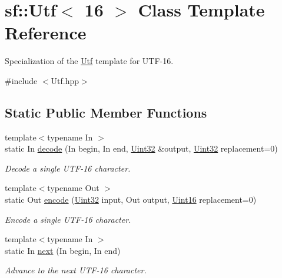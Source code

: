 \hypertarget{classsf_1_1_utf_3_0116_01_4}{\section{sf\-:\-:Utf$<$ 16 $>$ Class Template Reference}
\label{classsf_1_1_utf_3_0116_01_4}
}


Specialization of the \hyperlink{classsf_1_1_utf}{Utf} template for U\-T\-F-\/16.  




{\ttfamily \#include $<$Utf.\-hpp$>$}

\subsection*{Static Public Member Functions}
\begin{DoxyCompactItemize}
\item 
{\footnotesize template$<$typename In $>$ }\\static In \hyperlink{classsf_1_1_utf_3_0116_01_4_a17be6fc08e51182e7ac8bf9269dfae37}{decode} (In begin, In end, \hyperlink{namespacesf_aa746fb1ddef4410bddf198ebb27e727c}{Uint32} \&output, \hyperlink{namespacesf_aa746fb1ddef4410bddf198ebb27e727c}{Uint32} replacement=0)
\begin{DoxyCompactList}\small\item\em Decode a single U\-T\-F-\/16 character. \end{DoxyCompactList}\item 
{\footnotesize template$<$typename Out $>$ }\\static Out \hyperlink{classsf_1_1_utf_3_0116_01_4_a516090c84ceec2cfde0a13b6148363bb}{encode} (\hyperlink{namespacesf_aa746fb1ddef4410bddf198ebb27e727c}{Uint32} input, Out output, \hyperlink{namespacesf_a2fcaf787248b0b83dfb6b145ca348246}{Uint16} replacement=0)
\begin{DoxyCompactList}\small\item\em Encode a single U\-T\-F-\/16 character. \end{DoxyCompactList}\item 
{\footnotesize template$<$typename In $>$ }\\static In \hyperlink{classsf_1_1_utf_3_0116_01_4_ab899108d77ce088eb001588e84d91525}{next} (In begin, In end)
\begin{DoxyCompactList}\small\item\em Advance to the next U\-T\-F-\/16 character. \end{DoxyCompactList}\item 

\end{DoxyCompactItemize}
